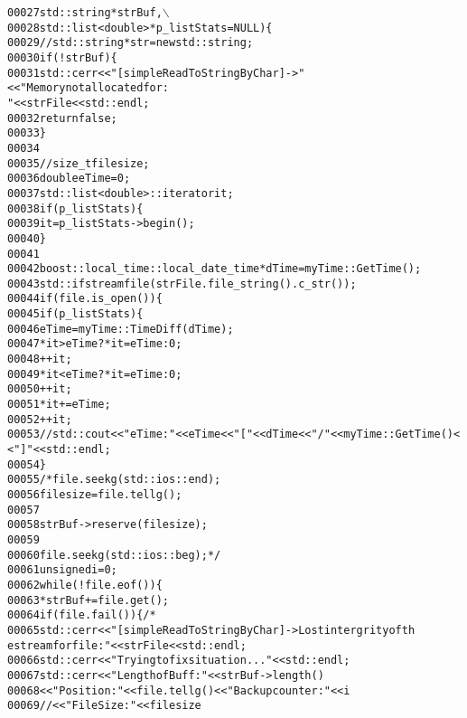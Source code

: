 \begin{footnotesize}
\begin{alltt}
00027                                          std::string *strBuf,\(\backslash\)
00028                                          std::list<double> *p\_listStats = NULL)\{
00029         \textcolor{comment}{//std::string *str = new std::string;}
00030         \textcolor{keywordflow}{if} (!strBuf)\{
00031             std::cerr<<\textcolor{stringliteral}{"[simpleReadToStringByChar]->"}<<\textcolor{stringliteral}{"Memory not allocated for:
       "}<<strFile<<std::endl;
00032             \textcolor{keywordflow}{return} \textcolor{keyword}{false};
00033         \}
00034 
00035 \textcolor{comment}{//        size\_t filesize;}
00036         \textcolor{keywordtype}{double} eTime = 0;
00037         std::list<double>::iterator it;
00038         \textcolor{keywordflow}{if}(p\_listStats)\{
00039             it = p\_listStats->begin();
00040         \}
00041 
00042         boost::local\_time::local\_date\_time *dTime = myTime::GetTime();
00043         std::ifstream file (strFile.file\_string().c\_str());
00044         \textcolor{keywordflow}{if} (file.is\_open())\{
00045             \textcolor{keywordflow}{if} (p\_listStats)\{
00046                 eTime = myTime::TimeDiff( dTime );
00047                 *it > eTime ? *it = eTime : 0;
00048                 ++it;
00049                 *it < eTime ? *it = eTime : 0;
00050                 ++it;
00051                 *it += eTime;
00052                 ++it;
00053                 \textcolor{comment}{//std::cout<<"eTime:"<<eTime<<"["<<dTime<<"/"<<myTime::GetTime()<
      <"]"<<std::endl;}
00054             \}
00055             \textcolor{comment}{/*file.seekg(std::ios::end);}
00056 \textcolor{comment}{            filesize=file.tellg();}
00057 \textcolor{comment}{}
00058 \textcolor{comment}{            strBuf->reserve(filesize);}
00059 \textcolor{comment}{}
00060 \textcolor{comment}{            file.seekg(std::ios::beg);*/}
00061             \textcolor{keywordtype}{unsigned} i = 0;
00062             \textcolor{keywordflow}{while} (!file.eof())\{
00063                 *strBuf  += file.get();
00064                 \textcolor{keywordflow}{if} (file.fail())\{\textcolor{comment}{/*}
00065 \textcolor{comment}{                    std::cerr<<"[simpleReadToStringByChar]->Lost intergrity of th
      e stream for file: "<<strFile<<std::endl;}
00066 \textcolor{comment}{                    std::cerr<<"Trying to fix situation..."<<std::endl;}
00067 \textcolor{comment}{                    std::cerr<<"Length of Buff: "<<strBuf->length()}
00068 \textcolor{comment}{                    <<"Position: "<<file.tellg()<<"Backup counter:"<<i}
00069 \textcolor{comment}{                    //<<"FileSize:"<<filesize}

\end{alltt}
\end{footnotesize}
